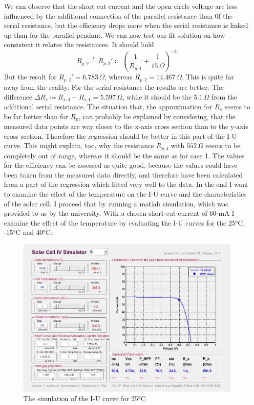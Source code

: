 \documentclass[a4paper, 12pt]{scrartcl}
\begin{document}
We can observe that the short cut current and the open circle voltage are less influenced by the additional connection of the parallel resistance than 0f the serial resistance, but the efficiency drops more when the serial resistance is linked up than for the parallel pendant. We can now test our fit solution on how consistent it relates the resistances. It should hold
\begin{equation*}R_{p,2}\overset{!}{=}R_{p,2}'\coloneqq\left(\frac{1}{R_{p,1}}+\frac{1}{15\,\Omega}\right)^{-1}\end{equation*}
But the result for $R_{p,2}'=6.783\,\Omega$, whereas $R_{p,2}=14.467\,\Omega$. This is quite far away from the reality. For the serial resistance the results are better. \newline
The difference $\Delta{R_s}\coloneqq{R_{s,3}-R_{s,1}}=5.597\,\Omega$, while it should be the $5.1\,\Omega$ from the additional serial resistance. The situation that, the approximation for $R_s$ seems to be far better than for $R_p$, can probably be explained by considering, that the measured data points are way closer to the x-axis cross section than to the y-axis cross section. Therefore the regression should be better in this part of the I-U curve.
This might explain, too, why the resistance $R_{p,4}$ with $552\,\Omega$ seems to be completely out of range, whereas it should be the same as for case 1.\newline\newline
The values for the efficiency can be assessed as quite good, because the values could have been taken from the measured data directly, and therefore have been calculated from a part of the regression which fitted very well to the data. \newline\newline
In the end I want to examine the effect of the temperature on the I-U curve and the characteristics of the solar cell. I proceed that by running a matlab simulation, which was provided to us by the university. With a chosen short cut current of 60 mA I examine the effect of the temperature by evaluating the I-U curves for the 25°C, -15°C and 40°C.
\begin{figure}[H]\centering\includegraphics[scale=0.4]{25 degree}\caption{The simulation of the I-U curve for 25°C}\end{figure}
\end{document}
